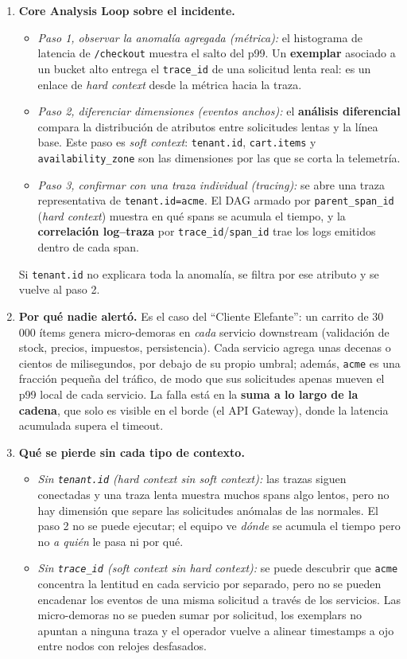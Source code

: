 \documentclass[variant=guia,cover=institutional,mode=screen]{ua-engineering-v6-article}
\begin{document}
\begin{uaanswer}
\begin{enumerate}
\item \textbf{Core Analysis Loop sobre el incidente.}
\begin{itemize}
\item \emph{Paso 1, observar la anomalía agregada (métrica):} el histograma de latencia de \texttt{/checkout} muestra el salto del p99. Un \textbf{exemplar} asociado a un bucket alto entrega el \texttt{trace\_id} de una solicitud lenta real: es un enlace de \emph{hard context} desde la métrica hacia la traza.
\item \emph{Paso 2, diferenciar dimensiones (eventos anchos):} el \textbf{análisis diferencial} compara la distribución de atributos entre solicitudes lentas y la línea base. Este paso es \emph{soft context}: \texttt{tenant.id}, \texttt{cart.items} y \texttt{availability\_zone} son las dimensiones por las que se corta la telemetría.
\item \emph{Paso 3, confirmar con una traza individual (tracing):} se abre una traza representativa de \texttt{tenant.id=acme}. El DAG armado por \texttt{parent\_span\_id} (\emph{hard context}) muestra en qué spans se acumula el tiempo, y la \textbf{correlación log--traza} por \texttt{trace\_id}/\texttt{span\_id} trae los logs emitidos dentro de cada span.
\end{itemize}
Si \texttt{tenant.id} no explicara toda la anomalía, se filtra por ese atributo y se vuelve al paso 2.
\item \textbf{Por qué nadie alertó.} Es el caso del ``Cliente Elefante'': un carrito de 30\,000 ítems genera micro-demoras en \emph{cada} servicio downstream (validación de stock, precios, impuestos, persistencia). Cada servicio agrega unas decenas o cientos de milisegundos, por debajo de su propio umbral; además, \texttt{acme} es una fracción pequeña del tráfico, de modo que sus solicitudes apenas mueven el p99 local de cada servicio. La falla está en la \textbf{suma a lo largo de la cadena}, que solo es visible en el borde (el API Gateway), donde la latencia acumulada supera el timeout.
\item \textbf{Qué se pierde sin cada tipo de contexto.}
\begin{itemize}
\item \emph{Sin \texttt{tenant.id} (hard context sin soft context):} las trazas siguen conectadas y una traza lenta muestra muchos spans algo lentos, pero no hay dimensión que separe las solicitudes anómalas de las normales. El paso 2 no se puede ejecutar; el equipo ve \emph{dónde} se acumula el tiempo pero no \emph{a quién} le pasa ni por qué.
\item \emph{Sin \texttt{trace\_id} (soft context sin hard context):} se puede descubrir que \texttt{acme} concentra la lentitud en cada servicio por separado, pero no se pueden encadenar los eventos de una misma solicitud a través de los servicios. Las micro-demoras no se pueden sumar por solicitud, los exemplars no apuntan a ninguna traza y el operador vuelve a alinear timestamps a ojo entre nodos con relojes desfasados.
\end{itemize}
\end{enumerate}
\end{uaanswer}
\end{document}
